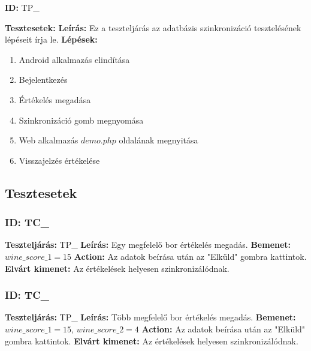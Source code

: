 \documentclass[12pt]{report}
\theoremstyle{definition}
\begin{document}
	\textbf{ID:}  TP\_\addtocounter{TP}{1}
	\newline
	\textbf{Tesztesetek:} 
	\newline
	\textbf{Leírás:} Ez a teszteljárás az adatbázis szinkronizáció tesztelésének lépéseit írja le.
	\newline
	\textbf{Lépések:}
	\begin{enumerate}
		\item Android alkalmazás elindítása
		\item Bejelentkezés
		\item Értékelés megadása
		\item Szinkronizáció gomb megnyomása
		\item Web alkalmazás $demo.php$ oldalának megnyitása
		\item Visszajelzés értékelése 
	\end{enumerate}
	
	
	
	\subsection{Tesztesetek}
	\setcounter{TPTCStart}{\value{TC}}
	
	\subsubsection{ID: TC\_}\addtocounter{TC}{1}
	\textbf{Teszteljárás:} TP\_
	\newline 
	\textbf{Leírás:} Egy megfelelő bor értékelés megadás.
	\newline 
	\textbf{Bemenet:} $wine\_score\_1 = 15$
	\newline 
	\textbf{Action:} Az adatok beírása után az "Elküld" gombra kattintok.
	\newline 
	\textbf{Elvárt kimenet:} Az értékelések helyesen szinkronizálódnak.
	
	\subsubsection{ID: TC\_}\addtocounter{TC}{1}
	\textbf{Teszteljárás:} TP\_
	\newline 
	\textbf{Leírás:} Több megfelelő bor értékelés megadás.
	\newline 
	\textbf{Bemenet:} $wine\_score\_1 = 15$, $wine\_score\_2 = 4$
	\newline 
	\textbf{Action:} Az adatok beírása után az "Elküld" gombra kattintok.
	\newline 
	\textbf{Elvárt kimenet:} Az értékelések helyesen szinkronizálódnak.
	
\end{document}
